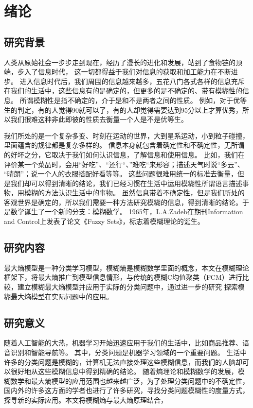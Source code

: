 \chapter[绪论]{绪论}
\section{研究背景}
\par
人类从原始社会一步步走到现在，经历了漫长的进化和发展，站到了食物链的顶端，步入了信息时代，
这一切都得益于我们对信息的获取和加工能力在不断进步。
进入信息时代后，我们周围的信息越来越多，五花八门各式各样的信息充斥在我们的生活中，这些信息有的是确定的，但更多的是不确定的、带有模糊性的信息。
所谓模糊性是指不确定的，介于是和不是两者之间的性质。
例如，对于优等生的判定，有的人觉得90就可以了，有的人却觉得需要达到95分以上才算优秀，所以我们很难这种非此即彼的性质去衡量一个人是不是优等生。
\par
我们所处的是一个复杂多变、时刻在运动的世界，大到星系运动，小到粒子碰撞，里面蕴含的规律都是复杂多样的。
信息本身就包含着确定性和不确定性，无所谓的好坏之分，它取决于我们如何认识信息，了解信息和使用信息。
比如，我们在评价某一个菜品时，会用“好吃”、“还行“、”难吃“来形容；描述天气时说“多云”、 “晴朗”；说一个人的衣服搭配好看等等。
这些问题很难用统一的标准去衡量，但是我们却可以得到清晰的结论，我们已经习惯在生活中运用模糊性所谓语言描述事物，用模糊的方法认识生活中的事物。
虽然信息带着不确定性，但是我们所处的客观世界是确定的，所以我们需要一种方法研究模糊的信息，得到清晰的结论。于是数学诞生了一个新的分支：模糊数学。
1965年，L.A.Zadeh在期刊Information and Control上发表了论文《Fuzzy Sets》，标志着模糊理论的诞生。
\section{研究内容}
最大熵模型是一种分类学习模型，模糊熵是模糊数学里面的概念，本文在模糊理论框架下，将最大熵推广到模型信息情形，与传统的模糊C均值聚类（FCM）进行比较，建立模糊最大熵模型并应用于实际的分类问题中，通过进一步的研究 探索模糊最大熵模型在实际问题中的应用。
\section{研究意义}
随着人工智能的大热，机器学习开始迅速应用于我们的生活中，比如商品推荐、语音识别和智能导航等。
其中，分类问题是机器学习领域的一个重要问题。
生活中许多的分类问题是模糊的，计算机无法直接处理这些模糊信息，而我们的人脑却可以很好地从这些模糊信息中得到精确的结论。
随着熵理论和模糊数学的发展，模糊数学和最大熵模型的应用范围也越来越广泛，为了处理分类问题中的不确定性，国内外的许多这方面的学者也进行了许多研究，寻找分类问题模糊性的度量方式，探寻新的实际应用。本文将模糊熵与最大熵原理结合，
